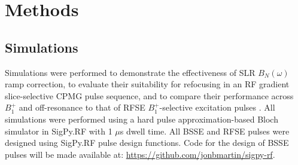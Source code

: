 \documentclass{article}
\begin{document}
\section*{Methods}
\subsection*{Simulations}
Simulations were performed to demonstrate the effectiveness of SLR $B_N(\omega)$ ramp correction, 
to evaluate their suitability for refocusing in an RF gradient slice-selective CPMG pulse sequence, 
and to compare their performance across $B_1^+$ and off-resonance to that of RFSE $B_1^+$-selective excitation pulses \cite{Grissom2014B1+-selectiveAlgorithm}. 
All simulations were performed using a hard pulse approximation-based Bloch simulator \cite{Pauly1991ParameterAlgorithm} in SigPy.RF \cite{Martin2020SigPy.RF:Research} with 1 $\mu$s dwell time. All BSSE and RFSE pulses were designed using SigPy.RF pulse design functions. Code for the design of BSSE pulses will be made available at: \url{https://github.com/jonbmartin/sigpy-rf}.
\end{document}
